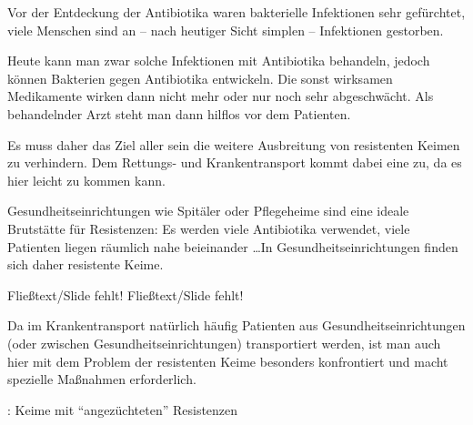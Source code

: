 Vor der Entdeckung der Antibiotika waren bakterielle Infektionen sehr
gefürchtet, viele Menschen sind an -- nach heutiger Sicht simplen --
Infektionen gestorben. 

Heute kann man zwar solche Infektionen mit Antibiotika behandeln, jedoch können
Bakterien  gegen Antibiotika entwickeln. Die sonst wirksamen Medikamente wirken dann nicht mehr oder
nur noch sehr abgeschwächt. Als behandelnder Arzt steht man dann hilflos vor dem
Patienten.



Es muss daher das Ziel aller sein die weitere Ausbreitung
von resistenten Keimen zu verhindern. Dem Rettungs- und Krankentransport kommt dabei eine
 zu, da es hier leicht zu
 kommen kann.



Gesundheitseinrichtungen wie Spitäler oder Pflegeheime sind eine ideale
Brutstätte für Resistenzen: Es werden viele Antibiotika
verwendet, viele Patienten liegen räumlich nahe beieinander
\ldots In Gesundheitseinrichtungen finden sich daher  resistente
Keime.

{
\begin{anfxwarning}[author=GABS]{Fließtext/Slide fehlt!}
   Fließtext/Slide fehlt!
\end{anfxwarning}

Da im Krankentransport
natürlich häufig Patienten aus Gesundheitseinrichtungen (oder zwischen
Gesundheitseinrichtungen) transportiert werden, ist man
auch hier mit dem Problem der resistenten Keime besonders
konfrontiert und macht spezielle Maßnahmen erforderlich.
}
{}
{}
{}
{}


: Keime mit "`angezüchteten"' Resistenzen


